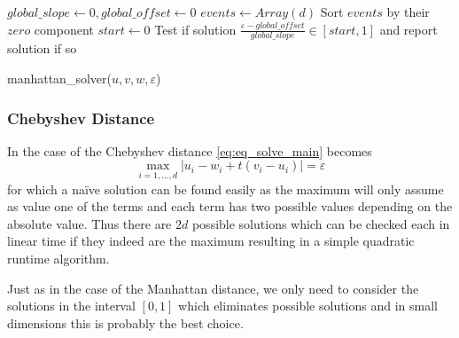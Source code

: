 \begin{algorithm}[ht]
  \DontPrintSemicolon
  \BlankLine
  \(global\_slope \gets 0, global\_offset \gets 0\) \;
  \(events \gets Array(d)\)
  Sort \(events\) by their \(zero\) component\;
  \(start \gets 0\)\;
  Test if solution \(\frac{\varepsilon - global\_offset}{global\_slope} \in [start, 1]\) and report solution if so\;

  \caption{manhattan\_solver(\(u, v, w, \varepsilon\))}
  \label{algo:solve_manhattan}
\end{algorithm}


\subsubsection{Chebyshev Distance}
\label{subsubsec:eq_chebyshev_distance}
In the case of the Chebyshev distance \cref{eq:eq_solve_main} becomes 
\begin{equation}
  \max_{i = 1,\dots, d} |u_i - w_i + t(v_i - u_i)| = \varepsilon\label{eq:solve_chebyshev}
\end{equation}
for which a na\"ive solution can be found easily as the maximum will only assume as value one of the terms and each term has two possible values depending on the absolute value. Thus there are \(2d\) possible solutions which can be checked each in linear time if they indeed are the maximum resulting in a simple quadratic runtime algorithm. 

Just as in the case of the Manhattan distance, we only need to consider the solutions in the interval \([0,1]\) which eliminates possible solutions and in small dimensions this is probably the best choice. 


